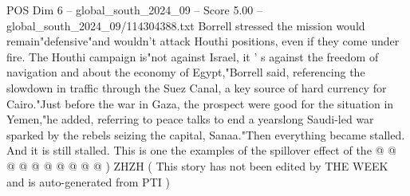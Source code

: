 \begin{textsample}{POS Dim 6 – global\_south\_2024\_09 – Score 5.00 – global\_south\_2024\_09/114304388.txt}
Borrell stressed the mission would remain"defensive"and wouldn't attack Houthi positions, even if they come under fire.
The Houthi campaign is"not against Israel, it ' s against the freedom of navigation and about the economy of Egypt,"Borrell said, referencing the slowdown in traffic through the Suez Canal, a key source of hard currency for Cairo."Just before the war in Gaza, the prospect were good for the situation in Yemen,"he added, referring to peace talks to end a yearslong Saudi-led war sparked by the rebels seizing the capital, Sanaa."Then everything became stalled.
And it is still stalled.
This is one the examples of the spillover effect of the @ @ @ @ @ @ @ @ @ @ ) ZHZH ( This story has not been edited by THE WEEK and is auto-generated from PTI )

\end{textsample}

